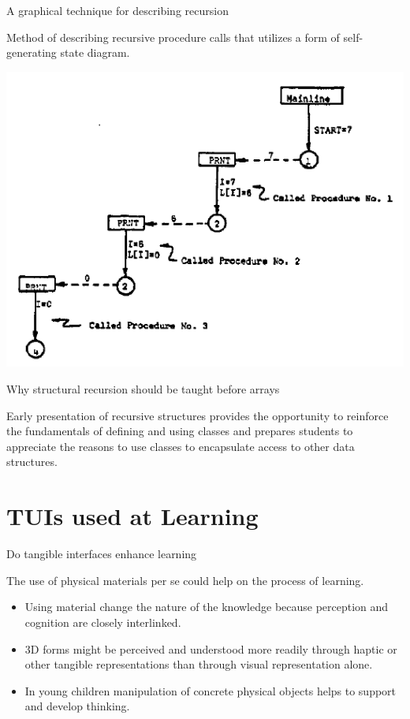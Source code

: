 \begin{frame}{A graphical technique for describing recursion}
  
  Method of describing recursive procedure calls that utilizes a
  form of self-generating state diagram.
  \medskip
  
  \includegraphics[scale=0.5]{img/visualizing_recursion.png}
\end{frame}

\begin{frame} {Why structural recursion should be taught before arrays}
  
  Early presentation of recursive structures provides the opportunity
  to reinforce the fundamentals of defining and using classes
  and prepares students to appreciate the reasons to use classes
  to encapsulate access to other data structures.
\end{frame}


\section{TUIs used at Learning}

\begin{frame} {Do tangible interfaces enhance learning}

  The use of physical materials per se could help on the
  process of learning.
  
  \begin{itemize}
  \item Using material change the nature of the knowledge
    because perception and cognition are closely interlinked.
  \item 3D forms might be perceived and understood more readily
    through haptic or other tangible representations than
    through visual representation alone.
  \item In young children manipulation of concrete
    physical objects helps to support and develop thinking.
  \end{itemize}
\end{frame}


